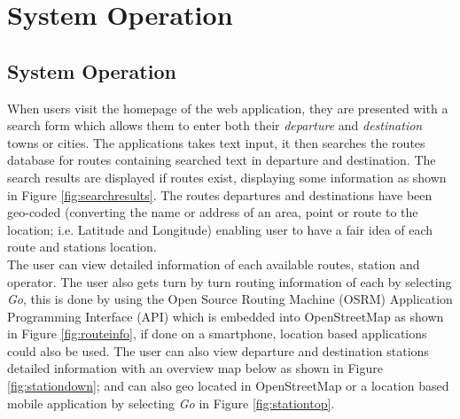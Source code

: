 
\chapter{System Operation} %



\ifpdf
    \graphicspath{{4/figures/PNG/}{4/figures/PDF/}{4/figures/}}
\else
    \graphicspath{{4/figures/EPS/}{4/figures/}}
\fi

\section{System Operation}
When users visit the homepage of the web application, they are presented with a search form which allows them to enter both their \textit{departure} and \textit{destination} towns or cities. The applications takes text input, it then searches the routes database for routes containing searched text in departure and destination. The search results are displayed if routes exist,  displaying some information as shown in Figure \ref{fig:searchresults}. The routes departures and destinations have been geo-coded (converting the name or address of an area, point or route to the location; i.e. Latitude and Longitude) enabling user to have a fair idea of each route and stations location.\\

The user can view detailed information of each available routes, station and operator. The user also gets turn by turn routing information of each by selecting \textit{Go}, this is done by using the Open Source Routing Machine (OSRM) Application Programming Interface (API) which is embedded into OpenStreetMap as shown in Figure \ref{fig:routeinfo}, if done on a smartphone, location based applications could also be used. The user can also view departure and destination stations detailed information with an overview map below as shown in Figure \ref{fig:stationdown}; and can also geo located in OpenStreetMap or a location based mobile application by selecting \textit{Go} in Figure \ref{fig:stationtop}.

